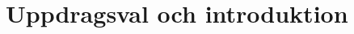 \documentclass[10pt]{beamer}
\begin{document}
%
%
%
%
%
%

\section{Uppdragsval och introduktion}

% 
% 
\end{document}
